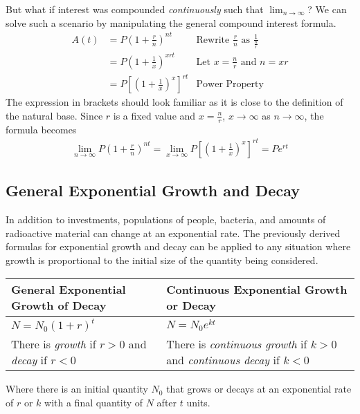 \documentclass[11pt]{article}
\begin{document}
But what if interest was compounded \textit{continuously} such that $\lim_{n \to \infty}$? We can solve such a scenario by manipulating the general compound interest formula. 
\begin{align*}
    A(t) &= P\left(1 + \frac{r}{n}\right)^{nt} & \text{Rewrite $\frac{r}{n}$ as $\frac{1}{\frac{n}{r}}$} \\
         &= P\left(1 + \frac{1}{x}\right)^{xrt} & \text{Let $x = \frac{n}{r}$ and $n = xr$}\\  
         &= P\left[\left(1 + \frac{1}{x}\right)^{x}\right]^{rt} & \text{Power Property}
\end{align*}
The expression in brackets should look familiar as it is close to the definition of the natural base. Since $r$ is a fixed value and $x = \frac{n}{r}$, $x\to\infty$ as $n\to\infty$, the formula becomes
\begin{align*}
    \lim_{n \to \infty} P\left(1 + \frac{r}{n}\right)^{nt} = \lim_{x \to \infty} P\left[\left(1 + \frac{1}{x}\right)^{x}\right]^{rt} = Pe^{rt}
\end{align*}

\subsection{General Exponential Growth and Decay}

In addition to investments, populations of people, bacteria, and amounts of radioactive material can change at an exponential rate. The previously derived formulas for exponential growth and decay can be applied to any situation where growth is proportional to the initial size of the quantity being considered.

\begin{table}[H]
    \centering
    \begin{tabular}{|p{7cm}|p{7cm}|}
    \hline
        General Exponential Growth of Decay & Continuous Exponential Growth or Decay \\
        \hline
        $N = N_{0}(1 + r)^{t}$ & $N = N_{0}e^{kt}$ \\
        There is \textit{growth} if $r > 0$ and \textit{decay} if $r < 0$ & There is \textit{continuous growth} if $k > 0$ and \textit{continuous decay} if $k < 0$ \\
        \hline
    \end{tabular}
\end{table}

Where there is an initial quantity $N_{0}$ that grows or decays at an exponential rate of $r$ or $k$ with a final quantity of $N$ after $t$ units.
\end{document}
